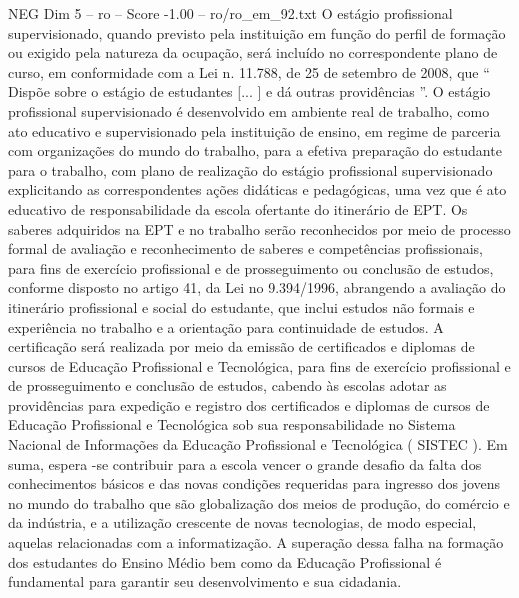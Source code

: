 \begin{textsample}{NEG Dim 5 – ro – Score -1.00 – ro/ro\_em\_92.txt}
O estágio profissional supervisionado, quando previsto pela instituição em função do perfil de formação ou exigido pela natureza da ocupação, será incluído no correspondente plano de curso, em conformidade com a Lei n. 11.788, de 25 de setembro de 2008, que “ Dispõe sobre o estágio de estudantes [... ] e dá outras providências ”.
O estágio profissional supervisionado é desenvolvido em ambiente real de trabalho, como ato educativo e supervisionado pela instituição de ensino, em regime de parceria com organizações do mundo do trabalho, para a efetiva preparação do estudante para o trabalho, com plano de realização do estágio profissional supervisionado explicitando as correspondentes ações didáticas e pedagógicas, uma vez que é ato educativo de responsabilidade da escola ofertante do itinerário de EPT.
Os saberes adquiridos na EPT e no trabalho serão reconhecidos por meio de processo formal de avaliação e reconhecimento de saberes e competências profissionais, para fins de exercício profissional e de prosseguimento ou conclusão de estudos, conforme disposto no artigo 41, da Lei no 9.394/1996, abrangendo a avaliação do itinerário profissional e social do estudante, que inclui estudos não formais e experiência no trabalho e a orientação para continuidade de estudos.
A certificação será realizada por meio da emissão de certificados e diplomas de cursos de Educação Profissional e Tecnológica, para fins de exercício profissional e de prosseguimento e conclusão de estudos, cabendo às escolas adotar as providências para expedição e registro dos certificados e diplomas de cursos de Educação Profissional e Tecnológica sob sua responsabilidade no Sistema Nacional de Informações da Educação Profissional e Tecnológica ( SISTEC ).
Em suma, espera -se contribuir para a escola vencer o grande desafio da falta dos conhecimentos básicos e das novas condições requeridas para ingresso dos jovens no mundo do trabalho que são globalização dos meios de produção, do comércio e da indústria, e a utilização crescente de novas tecnologias, de modo especial, aquelas relacionadas com a informatização.
A superação dessa falha na formação dos estudantes do Ensino Médio bem como da Educação Profissional é fundamental para garantir seu desenvolvimento e sua cidadania.

\end{textsample}
